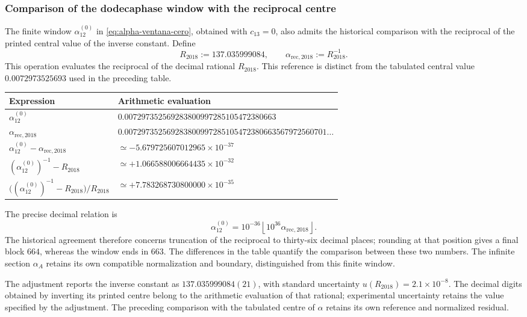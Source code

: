 \subsubsection{Comparison of the dodecaphase window with the reciprocal centre}
\label{sec:contraste-ventana-reciproco}

The finite window \(\alpha_{12}^{(0)}\) in
\eqref{eq:alpha-ventana-cero}, obtained with \(c_{13}=0\), also admits
the historical comparison with the reciprocal of the printed central
value of the inverse constant. Define
\[
 R_{2018}:=137.035999084,\qquad
 \alpha_{\mathrm{rec},2018}:=R_{2018}^{-1}.
\]
This operation evaluates the reciprocal of the decimal rational
\(R_{2018}\). This reference is distinct from the tabulated central
value \(0.0072973525693\) used in the preceding table.

\begin{center}
\begin{tabular}{@{}ll@{}}
\toprule
Expression & Arithmetic evaluation\\
\midrule
\(\alpha_{12}^{(0)}\) &
\(0.007297352569283800997285105472380663\)\\
\(\alpha_{\mathrm{rec},2018}\) &
\(0.007297352569283800997285105472380663567972560701\ldots\)\\
\(\alpha_{12}^{(0)}-\alpha_{\mathrm{rec},2018}\) &
\(\simeq-5.679725607012965\times10^{-37}\)\\
\((\alpha_{12}^{(0)})^{-1}-R_{2018}\) &
\(\simeq+1.066588006664435\times10^{-32}\)\\
\(\bigl((\alpha_{12}^{(0)})^{-1}-R_{2018}\bigr)/R_{2018}\) &
\(\simeq+7.783268730800000\times10^{-35}\)\\
\bottomrule
\end{tabular}
\end{center}

The precise decimal relation is
\[
 \alpha_{12}^{(0)}
 =10^{-36}\left\lfloor10^{36}\alpha_{\mathrm{rec},2018}\right\rfloor.
\]
The historical agreement therefore concerns truncation of the
reciprocal to thirty-six decimal places; rounding at that position
gives a final block \(664\), whereas the window ends in \(663\).
The differences in the table quantify the comparison between these
two numbers. The infinite section \(\alpha_A\) retains its own
compatible normalization and boundary, distinguished from this
finite window.

The adjustment reports the inverse constant as
\(137.035999084(21)\), with standard uncertainty
\(u(R_{2018})=2.1\times10^{-8}\)\cite{codata2018}.
The decimal digits obtained by inverting its printed centre belong
to the arithmetic evaluation of that rational; experimental uncertainty
retains the value specified by the adjustment. The preceding comparison
with the tabulated centre of \(\alpha\) retains its own reference and
normalized residual.
